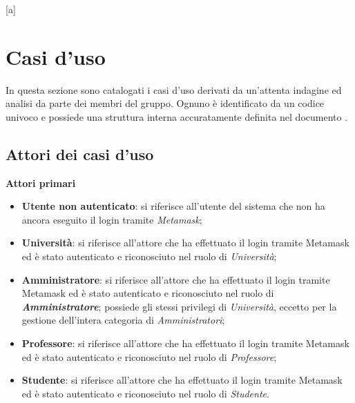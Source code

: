 \newcommand{\taskO}[1]{
	\refstepcounter{a}
	\label{#1}
}

[a]
\newcommand{\taskOO}[1]{
	\refstepcounter{b}
	\label{#1}
}

\section{Casi d'uso}
In questa sezione sono catalogati i casi d'uso derivati da un'attenta indagine ed analisi da parte dei membri del gruppo. Ognuno è identificato da un codice univoco e possiede una struttura interna accuratamente definita nel documento \NdP{}.
\subsection{Attori dei casi d'uso}
\textbf{Attori primari}
	\begin{itemize}
		\item \textbf{Utente non autenticato}: si riferisce all'utente del sistema che non ha ancora eseguito il login tramite \emph{Metamask};
		\item \textbf{Università}: si riferisce all'attore che ha effettuato il login tramite Metamask ed è stato autenticato e riconosciuto nel ruolo di \emph{Università};
		\item \textbf{Amministratore}: si riferisce all'attore che ha effettuato il login tramite Metamask ed è stato autenticato e riconosciuto nel ruolo di \emph\textbf{{Amministratore}}; possiede gli stessi privilegi di \emph{Università}, eccetto per la gestione dell'intera categoria di \emph{Amministratori};
		\item \textbf{Professore}: si riferisce all'attore che ha effettuato il login tramite Metamask ed è stato autenticato e riconosciuto nel ruolo di \emph{Professore};
		\item \textbf{Studente}: si riferisce all'attore che ha effettuato il login tramite Metamask ed è stato autenticato e riconosciuto nel ruolo di \emph{Studente}.
	\end{itemize}

